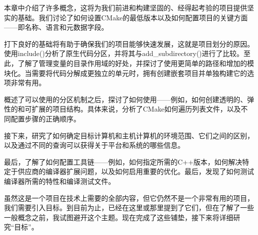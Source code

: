 本章中介绍了许多概念，这将为我们前进和构建坚固的、经得起考验的项目提供坚实的基础。我们讨论了如何设置CMake的最低版本以及如何配置项目的关键方面——即名称、语言和元数据字段。

打下良好的基础将有助于确保我们的项目能够快速发展，这就是项目划分的原因。使用include()分析了原生代码分区，并将其与add\_subdirectory()进行了比较。至此，了解了管理变量的目录作用域的好处，并探讨了使用更简单的路径和增加的模块化。当需要将代码分解成更独立的单元时，拥有创建嵌套项目并单独构建它的选项非常有用。

概述了可以使用的分区机制之后，探讨了如何使用——例如，如何创建透明的、弹性的和可扩展的项目结构。具体来说，分析了CMake如何遍历列表文件，以及不同配置步骤的正确顺序。

接下来，研究了如何确定目标计算机和主机计算机的环境范围、它们之间的区别，以及通过不同的查询可以获得关于平台和系统的哪些信息。

最后，了解了如何配置工具链——例如，如何指定所需的C++版本，如何解决特定于供应商的编译器扩展问题，以及如何启用重要的优化。最后，发现了如何测试编译器所需的特性和编译测试文件。

虽然这是一个项目在技术上需要的全部内容，但它仍然不是一个非常有用的项目，我们需要引入目标。到目前为止，已经在这里或那里提到了它们，但在了解了一些一般概念之前，我试图避开这个主题。现在完成了这些铺垫，接下来将详细研究“目标”。